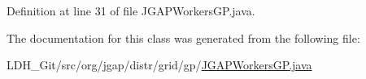 Definition at line 31 of file J\-G\-A\-P\-Workers\-G\-P.\-java.



The documentation for this class was generated from the following file\-:\begin{DoxyCompactItemize}
\item 
L\-D\-H\-\_\-\-Git/src/org/jgap/distr/grid/gp/\hyperlink{_j_g_a_p_workers_g_p_8java}{J\-G\-A\-P\-Workers\-G\-P.\-java}\end{DoxyCompactItemize}
